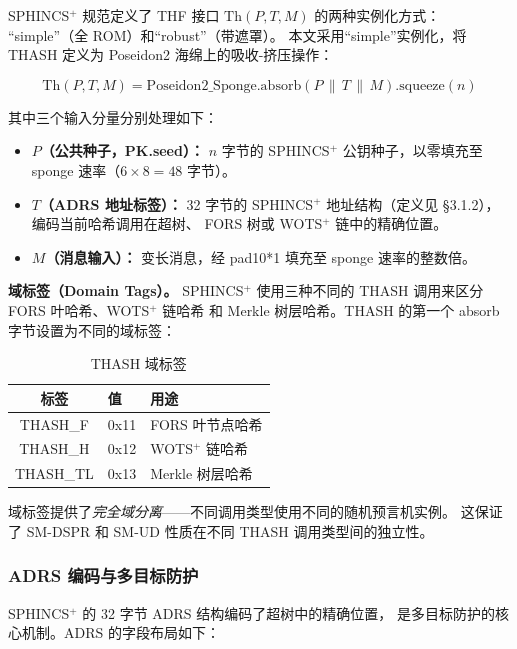 \documentclass[11pt,a4paper]{ctexart}
\begin{document}
SPHINCS$^+$ 规范定义了 THF 接口 $\mathrm{Th}(P, T, M)$ 的两种实例化方式：
``simple''（全 ROM）和``robust''（带遮罩）。
本文采用``simple''实例化，将 THASH 定义为 Poseidon2 海绵上的吸收-挤压操作：

\begin{equation}
  \mathrm{Th}(P, T, M) = \mathrm{Poseidon2\_Sponge}.\mathrm{absorb}(P \,\|\, T \,\|\, M).\mathrm{squeeze}(n)
\end{equation}

其中三个输入分量分别处理如下：

\begin{itemize}[leftmargin=*]
\item \textbf{$P$（公共种子，PK.seed）：}
$n$ 字节的 SPHINCS$^+$ 公钥种子，以零填充至 sponge 速率（$6 \times 8 = 48$ 字节）。
\item \textbf{$T$（ADRS 地址标签）：}
32 字节的 SPHINCS$^+$ 地址结构（定义见 §3.1.2），编码当前哈希调用在超树、
FORS 树或 WOTS$^+$ 链中的精确位置。
\item \textbf{$M$（消息输入）：}
变长消息，经 pad10*1 填充至 sponge 速率的整数倍。
\end{itemize}

\textbf{域标签（Domain Tags）。}
SPHINCS$^+$ 使用三种不同的 THASH 调用来区分 FORS 叶哈希、WOTS$^+$ 链哈希
和 Merkle 树层哈希。THASH 的第一个 absorb 字节设置为不同的域标签：

\begin{table}[h]
\centering
\caption{THASH 域标签}
\label{tab:domain}
\begin{tabular}{@{}cll@{}}
\toprule
\textbf{标签} & \textbf{值} & \textbf{用途} \\
\midrule
THASH\_F  & 0x11 & FORS 叶节点哈希 \\
THASH\_H  & 0x12 & WOTS$^+$ 链哈希 \\
THASH\_TL & 0x13 & Merkle 树层哈希 \\
\bottomrule
\end{tabular}
\end{table}

域标签提供了\emph{完全域分离}——不同调用类型使用不同的随机预言机实例。
这保证了 SM-DSPR 和 SM-UD 性质在不同 THASH 调用类型间的独立性。

\subsubsection{ADRS 编码与多目标防护}

SPHINCS$^+$ 的 32 字节 ADRS 结构编码了超树中的精确位置，
是多目标防护的核心机制。ADRS 的字段布局如下：
\end{document}
